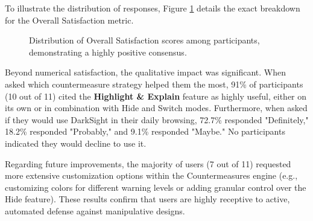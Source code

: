 \documentclass[12pt,a4paper]{article}
\begin{document}
To illustrate the distribution of responses, Figure \ref{fig:user_eval_chart} details the exact breakdown for the Overall Satisfaction metric.

\begin{figure}[htbp]
    \centering
    \caption{Distribution of Overall Satisfaction scores among participants, demonstrating a highly positive consensus.}
    \label{fig:user_eval_chart}
\end{figure}

Beyond numerical satisfaction, the qualitative impact was significant. When asked which countermeasure strategy helped them the most, 91\% of participants (10 out of 11) cited the \textbf{Highlight \& Explain} feature as highly useful, either on its own or in combination with Hide and Switch modes. Furthermore, when asked if they would use DarkSight in their daily browsing, 72.7\% responded "Definitely," 18.2\% responded "Probably," and 9.1\% responded "Maybe." No participants indicated they would decline to use it. 

Regarding future improvements, the majority of users (7 out of 11) requested more extensive customization options within the Countermeasures engine (e.g., customizing colors for different warning levels or adding granular control over the Hide feature). These results confirm that users are highly receptive to active, automated defense against manipulative designs.
\end{document}
